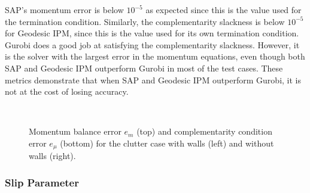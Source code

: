 SAP's momentum error is below $10^{-5}$ as expected since this is the value used
for the termination condition. Similarly, the complementarity slackness is below
$10^{-5}$ for Geodesic IPM, since this is the value used for its own termination
condition. Gurobi does a good job at satisfying the complementarity slackness.
However, it is the solver with the largest error in the momentum equations, even
though both SAP and Geodesic IPM outperform Gurobi in most of the test cases.
These metrics demonstrate that when SAP and Geodesic IPM outperform Gurobi, it
is not at the cost of losing accuracy.
\begin{figure}[!h]
	\centering
	\\
	\caption{\label{fig:clutter_errors_w_wall} 
	Momentum balance error $e_m$ (top) and complementarity condition error
	$e_\mu$ (bottom) for the clutter case with walls (left) and without walls
	(right).}
\end{figure}

\subsubsection{Slip Parameter}

